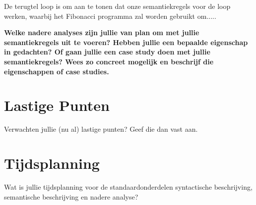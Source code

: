 \documentclass[11pt]{article}
\begin{document}
De terugtel loop is om aan te tonen dat onze semantiekregels voor de loop werken, waarbij het Fibonacci programma zal worden gebruikt om.....

{\bf
Welke nadere analyses zijn jullie van plan om met jullie semantiekregels uit te voeren? Hebben jullie een bepaalde eigenschap in gedachten? Of gaan jullie een case study doen met jullie semantiekregels? Wees zo concreet mogelijk en beschrijf die eigenschappen of case studies.
}

\section{Lastige Punten}

Verwachten jullie (nu al) lastige punten? Geef die dan vast aan.

\section{Tijdsplanning}

Wat is jullie tijdsplanning voor de standaardonderdelen syntactische beschrijving, semantische beschrijving en nadere analyse?


%
\end{document}
